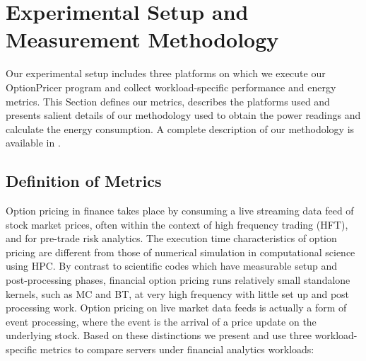 \section{Experimental Setup and Measurement Methodology}   
\label{sec:Experimental Setup and Measurement Methodology}
Our experimental setup includes three platforms on which we execute our
OptionPricer program and collect workload-specific performance and 
energy metrics. 
This Section defines our metrics, 
describes the platforms used and presents salient details of our methodology
used to obtain the power readings and calculate the energy consumption.
A complete description of our methodology is available  
in \cite{Georgakoudis2014}.

\subsection{Definition of Metrics} \label{sec:platforms:metrics}
Option pricing in finance takes place by consuming 
a live streaming data feed of stock market prices, often within the 
context of high frequency trading (HFT), and for pre-trade risk analytics.
The execution time characteristics of option pricing are different 
from those of numerical simulation in computational science using HPC.
By contrast to scientific codes which have measurable setup and 
post-processing phases, financial option pricing runs relatively small 
standalone kernels, such as MC and BT, at very high frequency with 
little set up and post processing work.
Option pricing on live market data feeds is actually a form of event 
processing, where the event is the arrival of a price update on the 
underlying stock. Based on these distinctions we present and use three 
workload-specific metrics to compare servers under financial analytics 
workloads:
